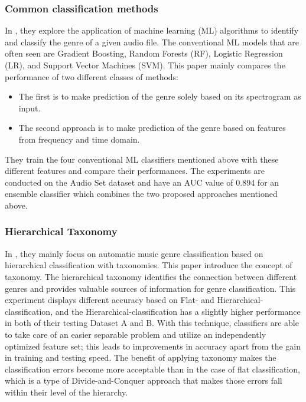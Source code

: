 \subsubsection{Common classification methods}

In \citet{Bahuleyan2018}, they explore the application of machine learning (ML) algorithms to identify and classify the genre of a given audio file. The conventional ML models that are often seen are Gradient Boosting, Random Forests (RF), Logistic Regression (LR), and Support Vector Machines (SVM). This paper mainly compares the performance of two different classes of methods:
\begin{itemize}
    \item The first is to make prediction of the genre solely based on its spectrogram as input.
    \item The second approach is to make prediction of the genre based on features from frequency and time domain.
\end{itemize}
They train the four conventional ML classifiers mentioned above with these different features and compare their performances. The experiments are conducted on the Audio Set dataset \cite{Gemmeke2017} and have an AUC value of 0.894 for an ensemble classifier which combines the two proposed approaches mentioned above.

\subsubsection{Hierarchical Taxonomy}

In \citet{Li2005}, they mainly focus on automatic music genre classification based on hierarchical classification with taxonomies. This paper introduce the concept of taxonomy. The hierarchical taxonomy identifies the connection between different genres and provides valuable sources of information for genre classification. This experiment displays different accuracy based on Flat- and Hierarchical-classification, and the  Hierarchical-classification has a slightly higher performance in both of their testing Dataset A and B.
With this technique, classifiers are able to take care of an easier separable problem and utilize an independently optimized feature set; this leads to improvements in accuracy apart from the gain in training and testing speed. The benefit of applying taxonomy makes the classification errors become more acceptable than in the case of flat classification, which is a type of Divide-and-Conquer approach that makes those errors fall within their level of the hierarchy.

